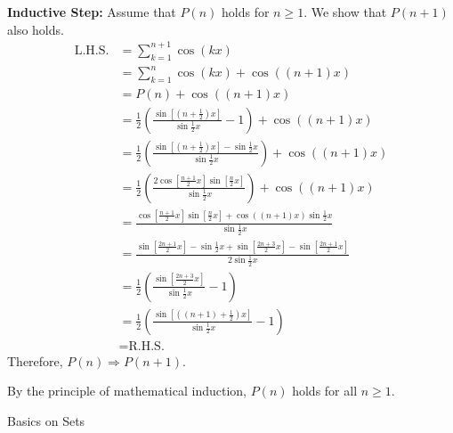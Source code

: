 \documentclass[answers]{exam}
\begin{document}
\begin{questions}
\begin{parts}
\begin{psol}
            \textbf{Inductive Step:} Assume that $P(n)$ holds for $n\geq 1$. We show that $P(n+1)$ also holds.
            \begin{align*}
                \text{L.H.S.} &= \sum_{k=1}^{n+1} \cos(kx) \\
                &= \sum_{k=1}^n \cos(kx) + \cos\left((n+1)x\right) \\
                &= P(n) + \cos\left((n+1)x\right) \\
                &= \frac{1}{2}\left(\frac{\sin\left[\left(n+\frac{1}{2}\right)x\right]}{\sin\frac{1}{2}x}-1\right) + \cos\left((n+1)x\right) \\
                &= \frac{1}{2}\left(\frac{\sin\left[\left(n+\frac{1}{2}\right)x\right]-\sin\frac{1}{2}x}{\sin\frac{1}{2}x}\right) + \cos\left((n+1)x\right) \\
                &= \frac{1}{2}\left(\frac{2\cos\left[\frac{n+1}{2}x\right]\sin\left[\frac{n}{2}x\right]}{\sin\frac{1}{2}x}\right) + \cos\left((n+1)x\right) \\
                &= \frac{\cos\left[\frac{n+1}{2}x\right]\sin\left[\frac{n}{2}x\right] + \cos\left((n+1)x\right)\sin\frac{1}{2}x}{\sin\frac{1}{2}x} \\
                &= \frac{\sin\left[\frac{2n+1}{2}x\right]-\sin\frac{1}{2}x+\sin\left[\frac{2n+3}{2}x\right]-\sin\left[\frac{2n+1}{2}x\right]}{2\sin\frac{1}{2}x} \\
                &= \frac{1}{2}\left(\frac{\sin\left[\frac{2n+3}{2}x\right]}{\sin\frac{1}{2}x}-1\right) \\
                &= \frac{1}{2}\left(\frac{\sin\left[\left(\left(n+1\right)+\frac{1}{2}\right)x\right]}{\sin\frac{1}{2}x}-1\right) \\
                &= \text{R.H.S.}
            \end{align*}
            Therefore, $P(n) \Rightarrow P(n+1)$.

            By the principle of mathematical induction, $P(n)$ holds for all $n\geq 1$.
        \end{psol}

    \end{parts}

    \question Basics on Sets

    \begin{parts}
        

\end{parts}
\end{questions}
\end{document}
